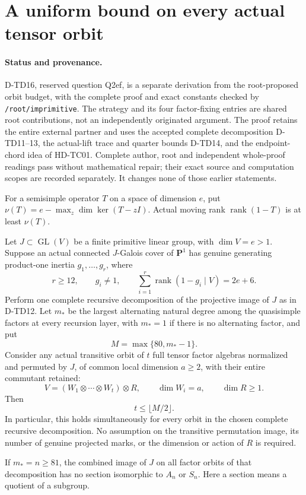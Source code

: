 \section{A uniform bound on every actual tensor orbit}
\label{sec:general-tensor-orbit-bound}

\paragraph{Status and provenance.}
D-TD16, reserved question Q2ef, is a separate derivation from the
root-proposed orbit budget, with the complete proof and exact constants
checked by \texttt{/root/imprimitive}. The strategy and its four
factor-fixing entries are shared root contributions, not an independently
originated argument. The proof retains the entire external partner and
uses the accepted complete decomposition D-TD11--13, the actual-lift
trace and quarter bounds D-TD14, and the endpoint-chord idea of HD-TC01.
Complete author, root and independent whole-proof readings pass without mathematical repair; their exact source and computation scopes are recorded separately.
It changes none of those earlier statements.

For a semisimple operator \(T\) on a space of dimension \(e\), put
\(\nu(T)=e-\max_z\dim\ker(T-zI)\). Actual moving rank
\(\operatorname{rank}(1-T)\) is at least \(\nu(T)\).

\begin{theorem}[D-TD16]
Let \(J\subset\operatorname{GL}(V)\) be a finite primitive linear
group, with \(\dim V=e>1\). Suppose an actual connected
\(J\)-Galois cover of \(\mathbf P^1\) has genuine generating
product-one inertia \(g_1,\ldots,g_r\), where
\[
 r\ge12,\qquad g_i\ne1,\qquad
 \sum_{i=1}^r\operatorname{rank}(1-g_i\mid V)=2e+6.
 \tag{TOR.1}
\]
Perform one complete recursive decomposition of the projective image
of \(J\) as in D-TD12. Let \(m_*\) be the largest alternating
natural degree among the quasisimple factors at every recursion layer,
with \(m_*=1\) if there is no alternating factor, and put
\[
                         M=\max\{80,m_*-1\}.
 \tag{TOR.2}
\]
Consider any actual transitive orbit of \(t\) full tensor factor
algebras normalized and permuted by \(J\), of common local dimension
\(a\ge2\), with their entire commutant retained:
\[
 V=(W_1\otimes\cdots\otimes W_t)\otimes R,
 \qquad \dim W_i=a,\qquad \dim R\ge1.
 \tag{TOR.3}
\]
Then
\[
                            t\le\lfloor M/2\rfloor.
 \tag{TOR.4}
\]
In particular, this holds simultaneously for every orbit in the chosen
complete recursive decomposition. No assumption on the transitive
permutation image, its number of genuine projected marks, or the
dimension or action of \(R\) is required.

If \(m_*=n\ge81\), the combined image of \(J\) on all factor
orbits of that decomposition has no section isomorphic to \(A_n\)
or \(S_n\). Here a section means a quotient of a subgroup.
\end{theorem}

